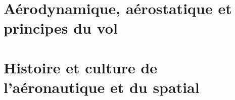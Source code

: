 \documentclass[a4paper,12pt,oneside]{report} %
\begin{document}
	\chapter{Aérodynamique, aérostatique et principes du vol}
	\label{aerodynamique}
		
		
		
		
	
	\chapter{Histoire et culture de l'aéronautique et du spatial}
	\label{histoire}
		
		
		
		

	
	\setcounter{tocdepth}{5}
	\tableofcontents
	
	\listoffigures
	
	\printglossaries

	\nocite{*}
	
	

	
	
	
			
	
\end{document}
